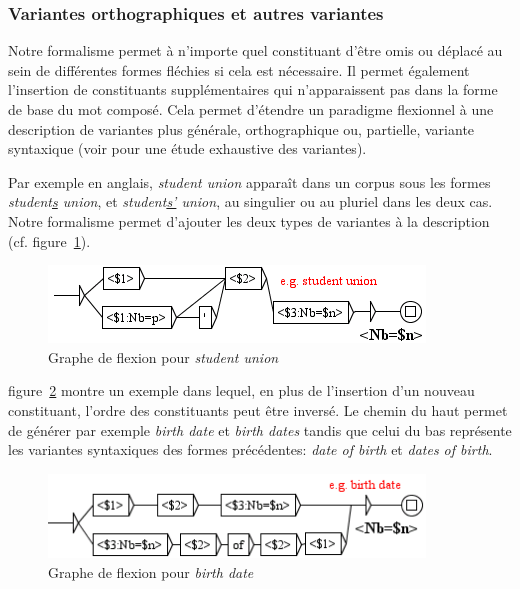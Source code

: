 \subsubsection{Variantes orthographiques et autres variantes}
Notre formalisme permet à n'importe quel constituant d'être omis ou déplacé au sein de différentes
formes fléchies si cela est nécessaire. Il permet également l'insertion de constituants
supplémentaires qui n'apparaissent pas dans la forme de base du mot composé. Cela permet d'étendre
un paradigme flexionnel à une description de variantes plus générale, orthographique ou, partielle,
variante syntaxique (voir \cite{Jacquemin01} pour une étude exhaustive des variantes).



Par exemple en anglais, 
\emph{student union} apparaît dans un corpus sous les formes \emph{student\underline{s} union}, et 
\emph{student\underline{s'} union}, au singulier ou au pluriel dans les deux cas. Notre formalisme 
permet d'ajouter les deux types de variantes à la description (cf. figure~\ref{fig:StudentUnion}).

\begin{figure}[!htb]
  \centering
  \includegraphics[width=10cm]{resources/img/StudentUnion.png}
  \caption{Graphe de flexion pour \emph{student union}}
  \label{fig:StudentUnion}
\end{figure}

\bigskip
\noindent figure~\ref{fig:BirthDate} montre un exemple dans lequel, en plus de l'insertion d'un
nouveau constituant, l'ordre des constituants peut être inversé. Le chemin du haut permet de
générer par exemple \emph{birth date} et \emph{birth dates} tandis que celui du bas représente
les variantes syntaxiques des formes précédentes: \emph{date of birth} et \emph{dates of birth}.

\begin{figure}[!htb]
  \centering
  \includegraphics[width=10cm]{resources/img/BirthDate.png}
  \caption{Graphe de flexion pour \emph{birth date}}
  \label{fig:BirthDate}
\end{figure}

